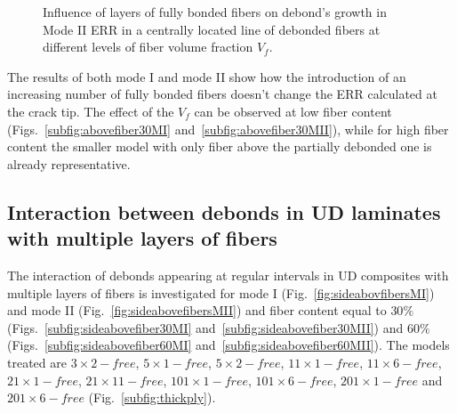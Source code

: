 \documentclass[review]{elsarticle}
\begin{document}
\begin{figure}[!h]
\caption{Influence of layers of fully bonded fibers on debond's growth in Mode II ERR in a centrally located line of debonded fibers at different levels of fiber volume fraction $V_{f}$.}\label{fig:abovefibersMII}
\end{figure}

The results of both mode I and mode II show how the introduction of an increasing number of fully bonded fibers doesn't change the ERR calculated at the crack tip. The effect of the $V_{f}$ can be observed at low fiber content (Figs.~\ref{subfig:abovefiber30MI} and~\ref{subfig:abovefiber30MII}), while for high fiber content the smaller model with only fiber above the partially debonded one is already representative. 

\subsection{Interaction between debonds in UD laminates with multiple layers of fibers}

The interaction of debonds appearing at regular intervals in UD composites with multiple layers of fibers is investigated for mode I (Fig.~\ref{fig:sideabovfibersMI}) and mode II (Fig.~\ref{fig:sideabovefibersMII}) and fiber content equal to $30\%$ (Figs.~\ref{subfig:sideabovefiber30MI} and~\ref{subfig:sideabovefiber30MII}) and $60\%$ (Figs.~\ref{subfig:sideabovefiber60MI} and~\ref{subfig:sideabovefiber60MII}). The models treated are $3\times 2-free$, $5\times 1-free$, $5\times 2-free$, $11\times 1-free$, $11\times 6-free$, $21\times 1-free$, $21\times 11-free$, $101\times 1-free$, $101\times 6-free$, $201\times 1-free$ and $201\times 6-free$ (Fig.~\ref{subfig:thickply}).
\end{document}
